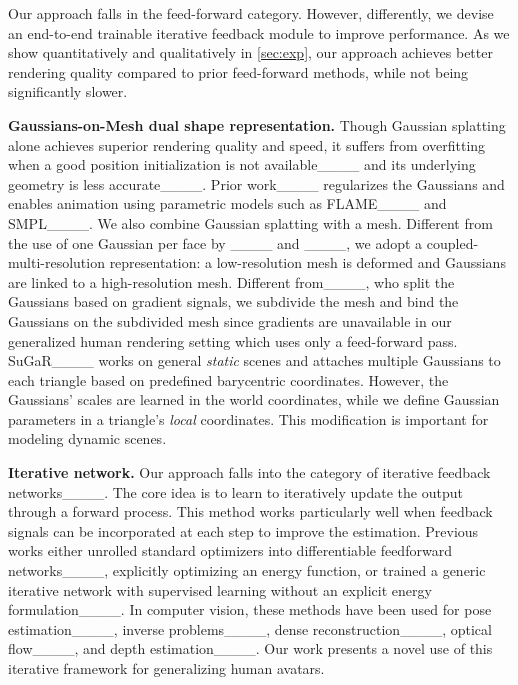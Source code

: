Our approach falls in the feed-forward category. However, differently, we devise an end-to-end trainable iterative feedback module to improve performance.  As we show quantitatively and qualitatively in \cref{sec:exp}, our approach achieves better rendering quality compared to prior feed-forward methods, while not being significantly slower.

\textbf{Gaussians-on-Mesh dual shape representation.} 
Though Gaussian splatting alone achieves superior rendering quality and speed, it suffers from overfitting when a good position initialization is not available____ and its underlying geometry is less accurate____. 
Prior work____ regularizes the Gaussians and enables animation using parametric models such as FLAME____ and SMPL____.
We also combine Gaussian splatting with a mesh. Different from the use of one Gaussian per face by ____ and ____, we adopt a coupled-multi-resolution representation: a low-resolution mesh is deformed and Gaussians are linked to a high-resolution mesh. Different from____, who split the Gaussians based on gradient signals, we subdivide the mesh and bind the Gaussians on the subdivided mesh since  gradients are unavailable in our generalized human rendering setting which uses only a feed-forward pass. SuGaR____ works on general \textit{static} scenes and attaches multiple Gaussians to each triangle based on predefined barycentric coordinates. However, the Gaussians' scales are learned in the world coordinates, while we define Gaussian parameters in a triangle's \textit{local} coordinates. %
This modification is important for modeling dynamic scenes. 

\textbf{Iterative network.} Our approach falls into the category of iterative feedback networks____. 
The core idea is to learn to iteratively update the output through a forward process. This method works particularly well when feedback signals can be incorporated at each step to improve the estimation. Previous works either unrolled standard optimizers into differentiable feedforward networks____, explicitly optimizing an energy function, or trained a generic iterative network with supervised learning without an explicit energy formulation____. In computer vision, these methods have been used for pose estimation____, inverse problems____, dense reconstruction____, optical flow____, and depth estimation____. 
Our work presents a novel use of this iterative framework for generalizing human avatars.